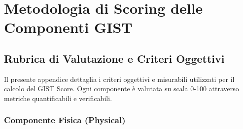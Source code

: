 \appendix
\chapter{Metodologia di Scoring delle Componenti GIST}
\label{app:scoring}

\section{Rubrica di Valutazione e Criteri Oggettivi}

Il presente appendice dettaglia i criteri oggettivi e misurabili utilizzati per il calcolo del GIST Score. Ogni componente è valutata su scala 0-100 attraverso metriche quantificabili e verificabili.

\subsection{Componente Fisica (Physical)}

